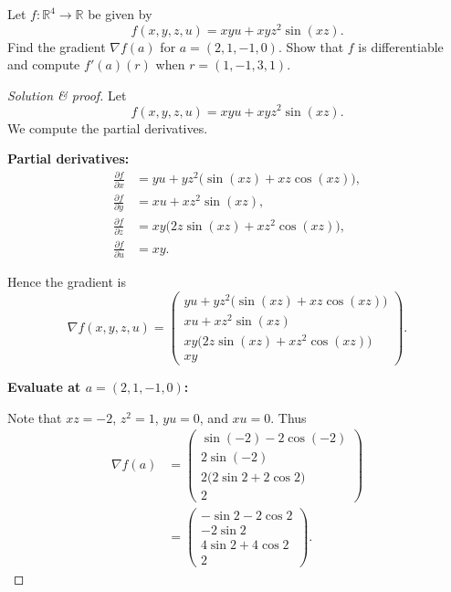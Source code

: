 \begin{prob}
    Let $f: \mathbb R^4 \to \mathbb R$ be given by 
    \[
        f(x,y,z,u) = xyu + xyz^2\sin(xz).
    \]
    Find the gradient $\nabla f(a)$ for $a = (2,1,-1,0)$. 
    Show that $f$ is differentiable and 
    compute $f'(a)(r)$ when $r = (1,-1,3,1)$.
\end{prob}
\begin{proof}[Solution \& proof]
    Let 
    \[
        f(x,y,z,u) = xyu + xyz^2 \sin(xz).
    \]
    We compute the partial derivatives.

    \medskip
    \noindent\textbf{Partial derivatives:}
    \begin{align*}
        \frac{\partial f}{\partial x}
        &= yu + yz^2\bigl(\sin(xz) + xz\cos(xz)\bigr), \\[6pt]
        \frac{\partial f}{\partial y}
        &= xu + xz^2 \sin(xz), \\[6pt]
        \frac{\partial f}{\partial z}
        &= xy\bigl(2z\sin(xz) + xz^2 \cos(xz)\bigr), \\[6pt]
        \frac{\partial f}{\partial u}
        &= xy.
    \end{align*}

    Hence the gradient is
    \[
        \nabla f(x,y,z,u)
        =
        \begin{pmatrix}
            yu + yz^2\bigl(\sin(xz) + xz\cos(xz)\bigr) \\
            xu + xz^2 \sin(xz) \\
            xy\bigl(2z\sin(xz) + xz^2 \cos(xz)\bigr) \\
            xy
        \end{pmatrix}.
    \]

    \medskip
    \noindent\textbf{Evaluate at \(a = (2,1,-1,0)\):}

    Note that \(xz = -2\), \(z^2 = 1\), \(yu = 0\), and \(xu = 0\). Thus
    \begin{align*}
        \nabla f(a)
        &=
        \begin{pmatrix}
            \sin(-2) - 2\cos(-2) \\
            2\sin(-2) \\
            2\bigl(2\sin 2 + 2\cos 2\bigr) \\
            2
        \end{pmatrix} \\
        &=
        \begin{pmatrix}
            -\sin 2 - 2\cos 2 \\
            -2\sin 2 \\
            4\sin 2 + 4\cos 2 \\
            2
        \end{pmatrix}.
    \end{align*}


\end{proof}

